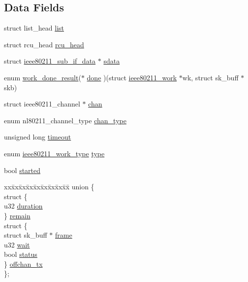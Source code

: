 \subsection*{Data Fields}
\begin{DoxyCompactItemize}
\item 
struct list\-\_\-head \hyperlink{structieee80211__work_a1f00f18b91d5a820f2c43064243aa86e}{list}
\item 
struct rcu\-\_\-head \hyperlink{structieee80211__work_ab698383409a24791490f962fe6990655}{rcu\-\_\-head}
\item 
struct \hyperlink{structieee80211__sub__if__data}{ieee80211\-\_\-sub\-\_\-if\-\_\-data} $\ast$ \hyperlink{structieee80211__work_ad829d8d33f06a7245cc303f924f259ac}{sdata}
\item 
enum \hyperlink{ieee80211__i_8h_a1d4a98716f0e0c48900c8d144ae73774}{work\-\_\-done\-\_\-result}($\ast$ \hyperlink{structieee80211__work_a8cafc3e050dcbac4c13d42bbed5da146}{done} )(struct \hyperlink{structieee80211__work}{ieee80211\-\_\-work} $\ast$wk, struct sk\-\_\-buff $\ast$skb)
\item 
struct ieee80211\-\_\-channel $\ast$ \hyperlink{structieee80211__work_ad695b849e189aedbc929a30c616fbfc7}{chan}
\item 
enum nl80211\-\_\-channel\-\_\-type \hyperlink{structieee80211__work_a82a2bcb2ebd1e6187c8057f98ce6bd3f}{chan\-\_\-type}
\item 
unsigned long \hyperlink{structieee80211__work_a639e65bbd749de17060d658eb233f72b}{timeout}
\item 
enum \hyperlink{ieee80211__i_8h_acbd73c3a23cb430f27ef21fe6d81d795}{ieee80211\-\_\-work\-\_\-type} \hyperlink{structieee80211__work_abf1dbe34cf79d583ad1c34c2fe8bbaec}{type}
\item 
bool \hyperlink{structieee80211__work_a43c08d193d555a2b2a61c53d2a4e5a63}{started}
\item 
\begin{tabbing}
xx\=xx\=xx\=xx\=xx\=xx\=xx\=xx\=xx\=\kill
union \{\\
\>struct \{\\
\>\>u32 \hyperlink{structieee80211__work_ae0565e8bbc0bf97f0747e1e4757fc5a0}{duration}\\
\>\} \hyperlink{structieee80211__work_a848f56cbf44ec6114e7da4547b616fb1}{remain}\\
\>struct \{\\
\>\>struct sk\_buff $\ast$ \hyperlink{structieee80211__work_a7ddb066bb78029e2130c2ccb2bf3ac08}{frame}\\
\>\>u32 \hyperlink{structieee80211__work_ad656a22cd7138c32438d6fff315a9611}{wait}\\
\>\>bool \hyperlink{structieee80211__work_ad1f0bff7112206922c9d5a87adad6f2b}{status}\\
\>\} \hyperlink{structieee80211__work_ab765c48f0901d818729d7a4031f0a284}{offchan\_tx}\\
\}; \\


\end{tabbing}
\end{DoxyCompactItemize}
